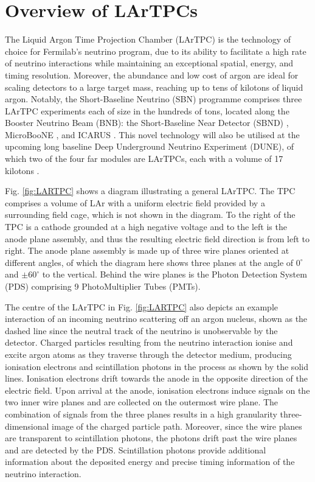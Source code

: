 \newpage

\section{Overview of LArTPCs}
\label{sec3:overview}
The Liquid Argon Time Projection Chamber (LArTPC) is the technology of choice for Fermilab's neutrino program, due to its ability to facilitate a high rate of neutrino interactions while maintaining an exceptional spatial, energy, and timing resolution. 
Moreover, the abundance and low cost of argon are ideal for scaling detectors to a large target mass, reaching up to tens of kilotons of liquid argon.
Notably, the Short-Baseline Neutrino (SBN) programme \cite{SBNProgram} comprises three LArTPC experiments each of size in the hundreds of tons, located along the Booster Neutrino Beam (BNB): the Short-Baseline Near Detector (SBND) \cite{sbnd_det}, MicroBooNE \cite{ubooneDet}, and ICARUS \cite{icarus_det}.
This novel technology will also be utilised at the upcoming long baseline Deep Underground Neutrino Experiment (DUNE), of which two of the four far modules are LArTPCs, each with a volume of 17 kilotons \cite{dunefd_det}.

Fig. \ref{fig:LARTPC} shows a diagram illustrating a general LArTPC.
The TPC comprises a volume of LAr with a uniform electric field provided by a surrounding field cage, which is not shown in the diagram.
To the right of the TPC is a cathode grounded at a high negative voltage and to the left is the anode plane assembly, and thus the resulting electric field direction is from left to right.
The anode plane assembly is made up of three wire planes oriented at different angles, of which the diagram here shows three planes at the angle of $0^{\circ}$ and $\pm60^{\circ}$ to the vertical.
Behind the wire planes is the Photon Detection System (PDS) comprising 9 PhotoMultiplier Tubes (PMTs).   

The centre of the LArTPC in Fig. \ref{fig:LARTPC} also depicts an example interaction of an incoming neutrino scattering off an argon nucleus, shown as the dashed line since the neutral track of the neutrino is unobservable by the detector.
Charged particles resulting from the neutrino interaction ionise and excite argon atoms as they traverse through the detector medium, producing ionisation electrons and scintillation photons in the process as shown by the solid lines.
Ionisation electrons drift towards the anode in the opposite direction of the electric field.
Upon arrival at the anode, ionisation electrons induce signals on the two inner wire planes and are collected on the outermost wire plane.
The combination of signals from the three planes results in a high granularity three-dimensional image of the charged particle path.
Moreover, since the wire planes are transparent to scintillation photons, the photons drift past the wire planes and are detected by the PDS.
Scintillation photons provide additional information about the deposited energy and precise timing information of the neutrino interaction.

